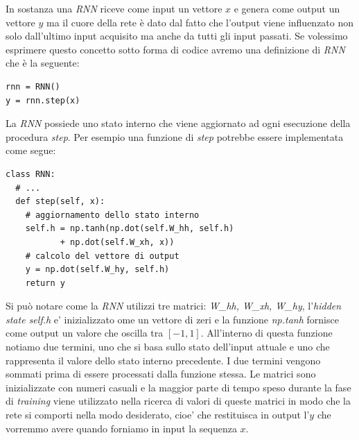 \documentclass[a4paper,12pt,openright,twoside]{report}
\theoremstyle{definition}
\begin{document}
In sostanza una \emph{RNN} riceve come input un vettore $x$ e genera come output un vettore $y$ ma il cuore della rete
è dato dal fatto che l'output viene influenzato non solo dall'ultimo input acquisito ma anche da tutti gli 
input passati. Se volessimo esprimere questo concetto sotto forma di codice avremo una definizione di \emph{RNN}
che è la seguente:
\begin{verbatim}
rnn = RNN()
y = rnn.step(x)
\end{verbatim}
La \emph{RNN} possiede uno stato interno che viene aggiornato ad ogni esecuzione della procedura \emph{step}.
Per esempio una funzione di \emph{step} potrebbe essere implementata come segue:
\begin{verbatim}
class RNN:
  # ...
  def step(self, x):
    # aggiornamento dello stato interno
    self.h = np.tanh(np.dot(self.W_hh, self.h) 
           + np.dot(self.W_xh, x))
    # calcolo del vettore di output
    y = np.dot(self.W_hy, self.h)
    return y
\end{verbatim}

Si può notare come la \emph{RNN} utilizzi tre matrici: \emph{W\_hh, W\_xh, W\_hy}, l'\emph{hidden state self.h}
e' inizializzato ome un vettore di zeri e la funzione \emph{np.tanh} fornisce come output un valore che oscilla tra $[-1,1]$.
All'interno di questa funzione notiamo due termini, uno che si basa sullo stato dell'input attuale e uno che 
rappresenta il valore dello stato interno precedente. I due termini vengono sommati prima di essere processati dalla 
funzione stessa.
Le matrici sono inizializzate con numeri casuali e la maggior parte di tempo speso durante la fase di
\emph{training} viene utilizzato nella ricerca di valori di queste matrici in modo che 
la rete si comporti nella modo desiderato, cioe' che restituisca in output l'$y$ che vorremmo avere
quando forniamo in input la sequenza $x$.
\end{document}
